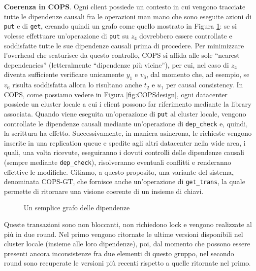 \documentclass[twoside]{article}
\begin{document}
\begin{multicols}{2}
\textbf{Coerenza in COPS}.
Ogni client possiede un contesto in cui vengono tracciate tutte le dipendenze causali fra le operazioni man mano che sono eseguite azioni di \texttt{put} e di \texttt{get}, creando quindi un grafo come quello mostrato in Figura \ref{fig:dipendenze}: se si volesse effettuare un'operazione di \texttt{put} su $z_4$ dovrebbero essere controllate e soddisfatte tutte le sue dipendenze causali prima di procedere. Per minimizzare l'overhead che scaturisce da questo controllo, COPS si affida alle sole ``nearest dependencies'' (letteralmente ``dipendenze più vicine''), per cui, nel caso di $z_4$ diventa sufficiente verificare unicamente $y_1$ e $v_6$, dal momento che, ad esempio, se $v_6$ risulta soddisfatta allora lo risultano anche $t_2$ e $u_1$ per causal consistency.
In COPS, come possiamo vedere in Figura \ref{fig:COPSdesign}, ogni datacenter possiede un cluster locale a cui i client possono far riferimento mediante la library associata.
Quando viene eseguita un'operazione di \texttt{put} al cluster locale, vengono controllate le dipendenze causali mediante un'operazione di \texttt{dep\_check} e, quindi, la scrittura ha effetto. Successivamente, in maniera asincrona, le richieste vengono inserite in una replication queue e spedite agli altri datacenter nella wide area, i quali, una volta ricevute, eseguiranno i dovuti controlli delle dipendenze causali (sempre mediante \texttt{dep\_check}), risolveranno eventuali conflitti e renderanno effettive le modifiche.
Citiamo, a questo proposito, una variante del sistema, denominata COPS-GT, che fornisce anche un'operazione di \texttt{get\_trans}, la quale permette di ritornare una visione coerente di un insieme di chiavi.
\begin{figure}[H]
\centering
{}
\caption{Un semplice grafo delle dipendenze}
\label{fig:dipendenze}
\end{figure}
Queste transazioni sono non bloccanti, non richiedono lock e vengono realizzate al più in due round. 
Nel primo vengono ritornate le ultime versioni disponibili nel cluster locale (insieme alle loro dipendenze), poi, dal momento che possono essere presenti ancora inconsistenze fra due elementi di questo gruppo, nel secondo round sono recuperate le versioni più recenti rispetto a quelle ritornate nel primo.

\end{multicols}
\end{document}
